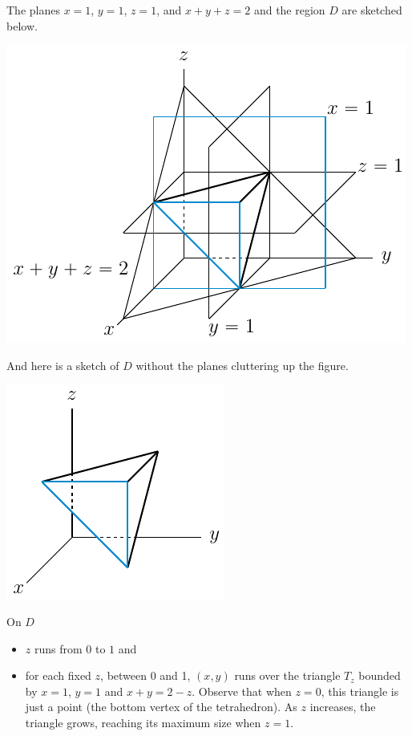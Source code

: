 \begin{solution}
The planes $x=1$, $y=1$, $z=1$, and $x+y+z=2$ and the region $D$ are 
sketched below.
\begin{center}
     \includegraphics{fig/OE01DQ8b.pdf}
\end{center}
And here is a sketch of $D$ without the planes cluttering up the figure.
\begin{center}
     \includegraphics{fig/OE01DQ8c.pdf}
\end{center}
On $D$
\begin{itemize}
\item
$z$ runs from $0$ to $1$ and
\item
for each fixed $z$, between 0 and 1, $(x,y)$ runs over the
triangle $T_z$ bounded by $x=1$, $y=1$ and $x+y=2-z$. Observe that when $z=0$,
this triangle is just a point (the bottom vertex of the tetrahedron). 
As $z$ increases, the triangle grows, reaching its maximum size when $z=1$.
\end{itemize}

\end{solution}
